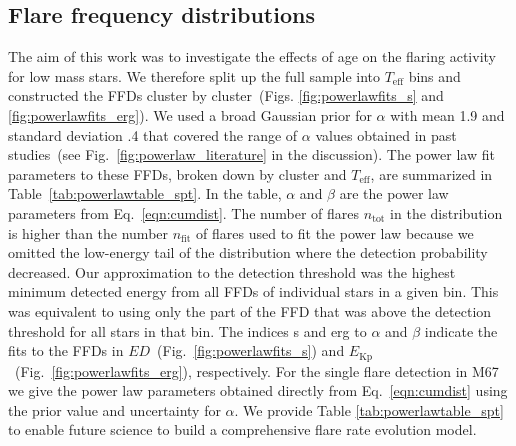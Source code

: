 \documentclass{aa}
\begin{document}
\subsection{Flare frequency distributions}
\label{sec:sec:ffds}
The aim of this work was to investigate the effects of age on the flaring activity for low mass stars. We therefore split up the full sample into $T_\mathrm{eff}$ bins and constructed the FFDs cluster by cluster~(Figs. \ref{fig:powerlawfits_s} and \ref{fig:powerlawfits_erg}). We used a broad Gaussian prior for $\alpha$ with mean 1.9 and standard deviation .4 that covered the range of $\alpha$ values obtained in past studies~(see Fig.~\ref{fig:powerlaw_literature} in the discussion). The power law fit parameters to these FFDs, broken down by cluster and $T_\mathrm{eff}$, are summarized in Table~\ref{tab:powerlawtable_spt}. In the table, $\alpha$ and $\beta$ are the power law parameters from Eq.~\ref{eqn:cumdist}. The number of flares $n_\mathrm{tot}$ in the distribution is higher than the number $n_\mathrm{fit}$ of flares used to fit the power law because we omitted the low-energy tail of the distribution where the detection probability decreased. Our approximation to the detection threshold was the highest minimum detected energy
from all FFDs of individual stars in a given bin. This was equivalent to using only the part of the FFD that was above the detection threshold for all stars in that bin. The indices s and erg to $\alpha$ and $\beta$ indicate the fits to the FFDs in $ED$~(Fig.~\ref{fig:powerlawfits_s}) and $E_\mathrm{Kp}$~(Fig.~\ref{fig:powerlawfits_erg}), respectively. For the single flare detection in M67 we give the power law parameters obtained directly from Eq.~\ref{eqn:cumdist} using the prior value and uncertainty for $\alpha$. We provide Table \ref{tab:powerlawtable_spt} to enable future science to build a comprehensive flare rate evolution model.
\end{document}
